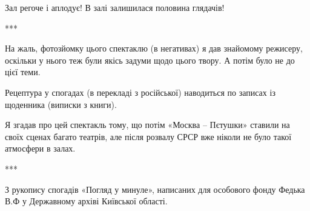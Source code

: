 Зал регоче і аплодує! В залі залишилася половина глядачів!

***

На жаль, фотозйомку цього спектаклю (в негативах) я дав знайомому режисеру,
оскільки у нього теж були якісь задуми щодо цього твору. А потім було не до
цієї теми.

Рецептура у спогадах (в перекладі з російської) наводиться по записах із
щоденника (виписки з книги).

Я згадав про цей спектакль тому, що потім «Москва – Пєтушки» ставили на своїх
сценах багато театрів, але після розвалу СРСР вже ніколи не було такої
атмосфери в залах.  

***

З рукопису спогадів «Погляд у минуле», написаних для особового фонду Федька В.Ф
у Державному архіві Київської області.

